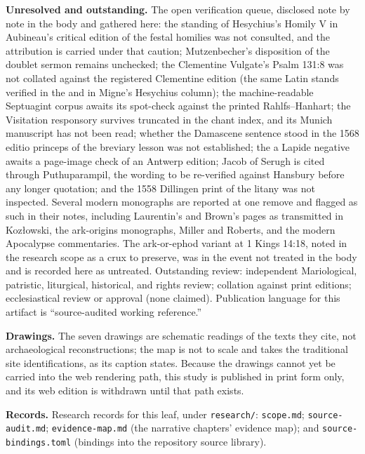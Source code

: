 \textbf{Unresolved and outstanding.} The open verification queue,
disclosed note by note in the body and gathered here: the standing of
Hesychius's Homily V in Aubineau's critical edition of the festal
homilies was not consulted, and the attribution is carried under that
caution; Mutzenbecher's disposition of the doublet sermon remains
unchecked; the Clementine Vulgate's Psalm 131:8 was not collated against
the registered Clementine edition (the same Latin stands verified in the
 and in Migne's Hesychius column); the
machine-readable Septuagint corpus awaits its spot-check against the
printed Rahlfs--Hanhart; the Visitation responsory  survives truncated in the chant index, and its Munich manuscript
has not been read; whether the Damascene  sentence stood in
the 1568 editio princeps of the breviary lesson was not established; the
a Lapide negative awaits a page-image check of an Antwerp edition; Jacob
of Serugh is cited through Puthuparampil, the wording to be re-verified
against Hansbury before any longer quotation; and the 1558 Dillingen
print of the litany was not inspected. Several modern monographs are
reported at one remove and flagged as such in their notes, including
Laurentin's and Brown's pages as transmitted in Kozłowski, the
ark-origins monographs, Miller and Roberts, and the modern Apocalypse
commentaries. The ark-or-ephod variant at 1 Kings 14:18, noted in the
research scope as a crux to preserve, was in the event not treated in
the body and is recorded here as untreated. Outstanding review:
independent Mariological, patristic, liturgical, historical, and rights
review; collation against print editions; ecclesiastical review or
approval (none claimed). Publication language for this artifact is
``source-audited working reference.''

\textbf{Drawings.} The seven drawings are schematic readings of the
texts they cite, not archaeological reconstructions; the map is not to
scale and takes the traditional site identifications, as its caption
states. Because the drawings cannot yet be carried into the web
rendering path, this study is published in print form only, and its web
edition is withdrawn until that path exists.

\textbf{Records.} Research records for this leaf, under
\texttt{research/}: \texttt{scope.md}; \texttt{source-audit.md};
\texttt{evidence-map.md} (the narrative chapters' evidence map); and
\texttt{source-bindings.toml} (bindings into the repository source
library).

